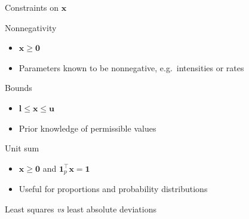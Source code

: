 \documentclass[16pt,aspectratio=169]{beamer}
\renewcommand{\vec}[1]{\ensuremath{\mathbf{#1}}}
\newcommand{\tr}{\ensuremath{\intercal}}
\begin{document}
\begin{frame}{Constraints on $\vec{x}$}
    \begin{block}{Nonnegativity}
        \begin{itemize}
            \item $\vec{x} \geq \vec{0}$
            \item Parameters known to be nonnegative, e.g.\ intensities or rates
        \end{itemize}
    \end{block}
    \begin{block}{Bounds}
        \begin{itemize}
            \item $\vec{l} \leq \vec{x} \leq \vec{u}$
            \item Prior knowledge of permissible values
        \end{itemize}
    \end{block}
    \begin{block}{Unit sum}
        \begin{itemize}
            \item $\vec{x} \geq \vec{0}$ and $\vec{1}^{\tr}_{p} \vec{x} = \vec{1}$
            \item Useful for proportions and probability distributions
        \end{itemize}
    \end{block}
\end{frame}

\begin{frame}{Least squares \textit{vs} least absolute deviations}
\end{frame}
\end{document}
